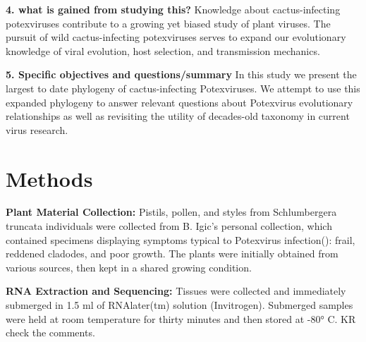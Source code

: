 \documentclass{article}
\begin{document}

\textbf{4. what is gained from studying this?} 
Knowledge about cactus-infecting potexviruses contribute to a growing yet biased study of plant viruses. The pursuit of wild cactus-infecting potexviruses serves to expand our evolutionary knowledge of viral evolution, host selection, and transmission mechanics. 


\textbf{5. Specific objectives and questions/summary}
In this study we present the largest to date phylogeny of cactus-infecting Potexviruses. We attempt to use this expanded phylogeny to answer relevant questions about Potexvirus evolutionary relationships as well as revisiting the utility of decades-old taxonomy in current virus research. 



\section*{Methods}

\textbf{Plant Material Collection:}
Pistils, pollen, and styles from Schlumbergera truncata individuals were collected from B. Igic's personal collection, which contained specimens displaying symptoms typical to Potexvirus infection(\cite{chessin_distribution_1972}): frail, reddened cladodes, and poor growth. The plants were initially obtained from various sources, then kept in a shared growing condition. 

\textbf{RNA Extraction and Sequencing:}
Tissues were collected and immediately submerged in 1.5 ml of  RNAlater(tm) solution (Invitrogen). Submerged samples were held at room temperature for thirty minutes and then stored at -80° C. KR check the comments.
\end{document}
